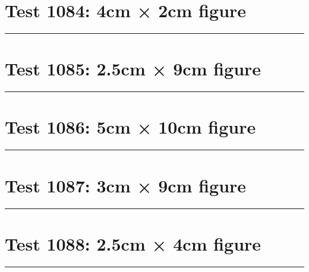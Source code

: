 \documentclass[a4paper,11pt]{article}
\begin{document}
\section*{Test 1084: 4cm × 2cm figure}
\begin{swarmwrap}%
  \begin{minipage}[t]{4cm}
    \centering
    \rule{\linewidth}{2cm}
  \end{minipage}%
\end{swarmwrap}%
\swarmwrapnext
\lipsum[66]
\lipsum[67]
\lipsum[68]
\section*{Test 1085: 2.5cm × 9cm figure}
\begin{swarmwrap}%
  \begin{minipage}[t]{2cm}
    \centering
    \rule{\linewidth}{9cm}
  \end{minipage}%
\end{swarmwrap}%
\swarmwrapnext
\lipsum[96]
\lipsum[97]
\lipsum[98]
\lipsum[99]
\section*{Test 1086: 5cm × 10cm figure}
\begin{swarmwrap}%
  \begin{minipage}[t]{5cm}
    \centering
    \rule{\linewidth}{10cm}
  \end{minipage}%
\end{swarmwrap}%
\swarmwrapnext
\lipsum[51]
\lipsum[52]
\lipsum[53]
\lipsum[54]
\section*{Test 1087: 3cm × 9cm figure}
\begin{swarmwrap}%
  \begin{minipage}[t]{3cm}
    \centering
    \rule{\linewidth}{9cm}
  \end{minipage}%
\end{swarmwrap}%
\swarmwrapnext
\lipsum[21]
\lipsum[22]
\lipsum[23]
\lipsum[24]
\section*{Test 1088: 2.5cm × 4cm figure}
\begin{swarmwrap}%
  \begin{minipage}[t]{2cm}
    \centering
    \rule{\linewidth}{4cm}
  \end{minipage}%
\end{swarmwrap}%
\swarmwrapnext
\lipsum[98]
\lipsum[99]
\lipsum[100]
\end{document}
